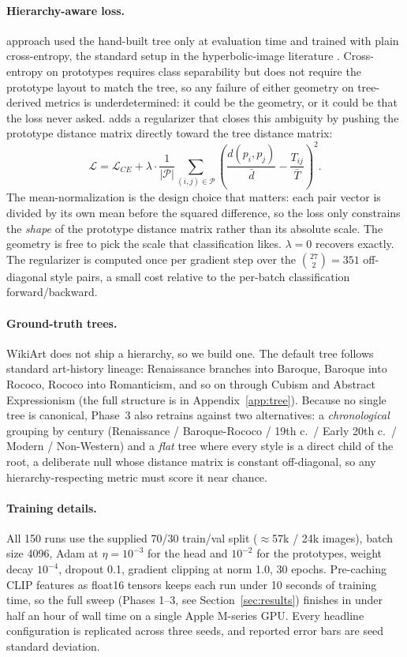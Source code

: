 \paragraph{Hierarchy-aware loss.} \msthreeposs{} approach used the
hand-built tree only at evaluation time and trained with plain
cross-entropy, the standard setup in the hyperbolic-image literature
\citep{khrulkov2020hyperbolic}. Cross-entropy on prototypes requires
class separability but does not require the prototype layout to match
the tree, so any failure of either geometry on tree-derived metrics is
underdetermined: it could be the geometry, or it could be that the
loss never asked. \msfour{} adds a regularizer that closes this
ambiguity by pushing the prototype distance matrix directly toward
the tree distance matrix:
\[
  \mathcal{L} = \mathcal{L}_{CE} + \lambda \cdot \frac{1}{|\mathcal{P}|}
    \sum_{(i,j) \in \mathcal{P}} \!\left(
      \frac{d(p_i, p_j)}{\bar{d}} - \frac{T_{ij}}{\bar{T}}
    \right)^{\!\!2}.
\]
The mean-normalization is the design choice that matters: each pair
vector is divided by its own mean before the squared difference, so the
loss only constrains the \emph{shape} of the prototype distance matrix
rather than its absolute scale. The geometry is free to pick the scale
that classification likes. $\lambda = 0$ recovers \msthree{} exactly. The
regularizer is computed once per gradient step over the
$\binom{27}{2} = 351$ off-diagonal style pairs, a small cost
relative to the per-batch classification forward/backward.

\paragraph{Ground-truth trees.} WikiArt does not ship a hierarchy, so
we build one. The default tree follows standard art-history lineage:
Renaissance branches into Baroque, Baroque into Rococo, Rococo into
Romanticism, and so on through Cubism and Abstract Expressionism (the
full structure is in Appendix~\ref{app:tree}). Because no single tree
is canonical, Phase~3 also retrains against two alternatives: a
\emph{chronological} grouping by century (Renaissance / Baroque-Rococo
/ 19th c.\ / Early 20th c.\ / Modern / Non-Western) and a \emph{flat}
tree where every style is a direct child of the root, a deliberate
null whose distance matrix is constant off-diagonal, so any
hierarchy-respecting metric must score it near chance.

\paragraph{Training details.} All 150 runs use the supplied 70/30
train/val split ($\approx$57k / 24k images), batch size 4096, Adam at
$\eta=10^{-3}$ for the head and $10^{-2}$ for the prototypes, weight
decay $10^{-4}$, dropout 0.1, gradient clipping at norm 1.0, 30
epochs. Pre-caching CLIP features as float16 tensors keeps each run
under 10 seconds of training time, so the full sweep (Phases 1--3, see
Section~\ref{sec:results}) finishes in under half an hour of wall time
on a single Apple M-series GPU. Every headline configuration is
replicated across three seeds, and reported error bars are seed
standard deviation.

